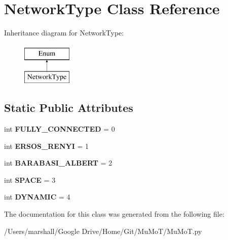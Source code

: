 \hypertarget{class_mu_mo_t_1_1_network_type}{}\section{Network\+Type Class Reference}
\label{class_mu_mo_t_1_1_network_type}
Inheritance diagram for Network\+Type\+:\begin{figure}[H]
\begin{center}
\leavevmode
\includegraphics[height=2.000000cm]{class_mu_mo_t_1_1_network_type}
\end{center}
\end{figure}
\subsection*{Static Public Attributes}
\begin{DoxyCompactItemize}
\item 
\mbox{\label{class_mu_mo_t_1_1_network_type_a6026c1d0088de63c8dbffa271c5cb8e4}} 
int {\bfseries F\+U\+L\+L\+Y\+\_\+\+C\+O\+N\+N\+E\+C\+T\+ED} = 0
\item 
\mbox{\label{class_mu_mo_t_1_1_network_type_abfc09d249fa8a7e47ccae49424a21d61}} 
int {\bfseries E\+R\+S\+O\+S\+\_\+\+R\+E\+N\+YI} = 1
\item 
\mbox{\label{class_mu_mo_t_1_1_network_type_a5684807d763efd4f800fe9a849cd962c}} 
int {\bfseries B\+A\+R\+A\+B\+A\+S\+I\+\_\+\+A\+L\+B\+E\+RT} = 2
\item 
\mbox{\label{class_mu_mo_t_1_1_network_type_a03813c265f977cc034eb42fd3370bf3d}} 
int {\bfseries S\+P\+A\+CE} = 3
\item 
\mbox{\label{class_mu_mo_t_1_1_network_type_ad86080ad7b724db9fc31c1e654eba020}} 
int {\bfseries D\+Y\+N\+A\+M\+IC} = 4
\end{DoxyCompactItemize}


The documentation for this class was generated from the following file\+:\begin{DoxyCompactItemize}
\item 
/\+Users/marshall/\+Google Drive/\+Home/\+Git/\+Mu\+Mo\+T/Mu\+Mo\+T.\+py\end{DoxyCompactItemize}
